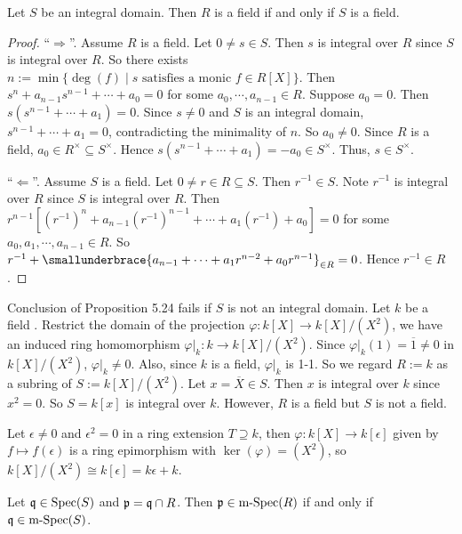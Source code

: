 \begin{proposition}
    Let $S$ be an integral domain. Then $R$ is a field if and only if $S$ is a field.
\end{proposition}

\begin{proof}
    ``$\Rightarrow$''. Assume $R$ is a field. Let $0 \neq s \in S$. Then $s$ is integral over $R$ since $S$ is integral over $R$. So there exists $n := \min\{\deg(f) \mid s \text{ satisfies a monic }f \in R[X]\}$. Then $s^{n} + a_{n-1}s^{n-1} + \cdots + a_0 = 0$ for some $a_0,\cdots,a_{n-1} \in R$. Suppose $a_0 = 0$. Then $s(s^{n-1} + \cdots + a_1) = 0$. Since $s \neq 0$ and $S$ is an integral domain, $s^{n-1} + \cdots +a_1 = 0$, contradicting the minimality of $n$. So $a_0 \neq 0$. Since $R$ is a field, $a_0 \in R^{\times} \subseteq S^{\times}$. Hence $s(s^{n-1} + \cdots + a_1) = -a_0 \in S^{\times}$. Thus, $s \in S^{\times}$. \par 
    ``$\Leftarrow$''. Assume $S$ is a field. Let $0 \neq r \in R \subseteq S$. Then $r^{-1} \in S$. Note $r^{-1}$ is integral over $R$ since $S$ is integral over $R$. Then $r^{n-1}[(r^{-1})^{n} + a_{n-1}(r^{-1})^{n-1} + \cdots + a_1(r^{-1}) + a_0] = 0$ for some $a_0,a_1,\cdots,a_{n-1} \in R$. So $r^{-1} + \smallunderbrace{a_{n-1} + \cdots + a_1r^{n-2} + a_0r^{n-1}}_{\in R} = 0$. Hence $r^{-1} \in R$.
\end{proof}

\begin{example*}
    Conclusion of Proposition 5.24 fails if $S$ is not an integral domain. Let $k$ be a field . Restrict the domain of the projection $\varphi: k[X] \to k[X]/(X^{2})$, we have an induced ring homomorphism $\varphi|_k: k \to k[X]/(X^{2})$. Since $\varphi|_k(1) = \overbar{1} \neq 0$ in $k[X]/(X^{2})$, $\varphi|_k \neq 0$. Also, since $k$ is a field, $\varphi|_k$ is 1-1. So we regard $R := k$ as a subring of $S := k[X]/(X^{2})$. Let $x = \overbar{X} \in S$. Then $x$ is integral over $k$ since $x^{2} = 0$. So $S = k[x]$ is integral over $k$. However, $R$ is a field but $S$ is not a field.  \par
    Let $\epsilon \neq 0$ and $\epsilon^{2} = 0$ in a ring extension $T \supseteq k$, then $\varphi: k[X] \to k[\epsilon]$ given by $f \mapsto f(\epsilon)$ is a ring epimorphism with $\ker(\varphi) = (X^{2})$, so $k[X]/(X^{2}) \cong k[\epsilon] = k\epsilon + k$.
\end{example*}

\begin{corollary}
    Let $\mathfrak{q} \in \operatorname{Spec}(S)$ and $\mathfrak{p} = \mathfrak{q} \cap R$. Then $\mathfrak{p} \in \operatorname{m-Spec}(R)$ if and only if $\mathfrak{q} \in \operatorname{m-Spec}(S)$. 
\end{corollary}

